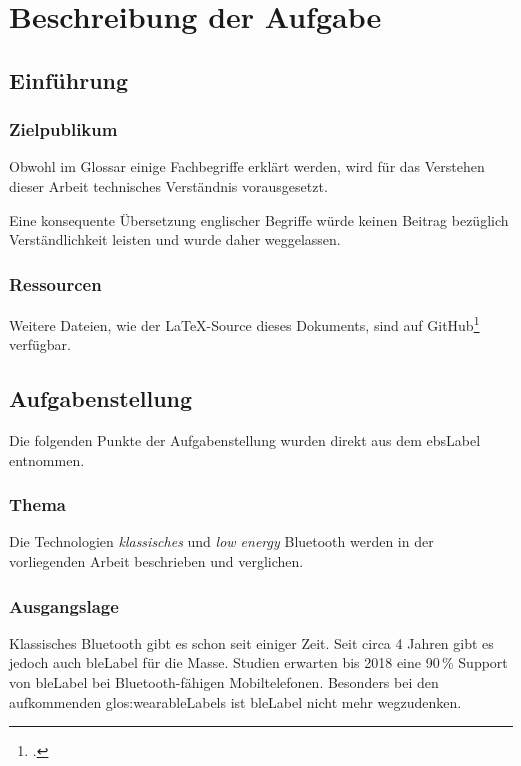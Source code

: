 \chapter{Beschreibung der Aufgabe}

\section{Einführung}
\subsection{Zielpublikum}
Obwohl im Glossar einige Fachbegriffe erklärt werden, wird für das Verstehen dieser Arbeit technisches Verständnis vorausgesetzt.

Eine konsequente Übersetzung englischer Begriffe würde keinen Beitrag bezüglich Verständlichkeit leisten und wurde daher weggelassen.

\subsection{Ressourcen}
Weitere Dateien, wie der \LaTeX-Source dieses Dokuments, sind auf GitHub\footcite{GitHub_ble-seminar_2015-04-17} verfügbar.

\section{Aufgabenstellung}
Die folgenden Punkte der Aufgabenstellung wurden direkt aus dem \gls{ebsLabel} entnommen.

\subsection{Thema}
Die Technologien \textit{klassisches} und \textit{low energy} Bluetooth werden in der vorliegenden Arbeit beschrieben und verglichen.

\subsection{Ausgangslage}
Klassisches Bluetooth gibt es schon seit einiger Zeit.
Seit circa 4 Jahren gibt es jedoch auch \gls{bleLabel} für die Masse. Studien erwarten bis 2018 eine 90\,\% Support von \gls{bleLabel} bei Bluetooth-fähigen Mobiltelefonen.
Besonders bei den aufkommenden \glspl{glos:wearableLabel} ist \gls{bleLabel} nicht mehr wegzudenken.


